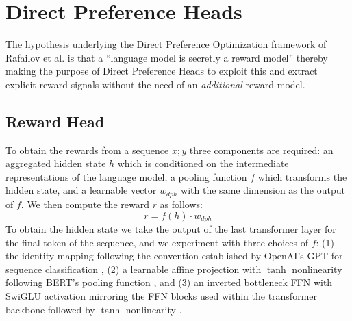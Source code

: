 \section{Direct Preference Heads}
The hypothesis underlying the Direct Preference Optimization framework of Rafailov et al. \cite{rafailov2023direct} is that a ``language model is secretly a reward model'' thereby making the purpose of Direct Preference Heads to exploit this and extract explicit reward signals without the need of an \emph{additional} reward model.



\subsection{Reward Head}
To obtain the rewards from a sequence $x;y$ three components are required: an aggregated hidden state $h$ which is conditioned on the intermediate representations of the language model, a pooling function $f$ which transforms the hidden state, and a learnable vector $w_{dph}$ with the same dimension as the output of $f$. We then compute the reward $r$ as follows:
\begin{equation}
    r=f(h) \cdot w_{dph}
\end{equation}
To obtain the hidden state we take the output of the last transformer layer for the final token of the sequence, and we experiment with three choices of $f$: (1) the identity mapping following the convention established by OpenAI's GPT for sequence classification \cite{Radford2018ImprovingLU}, (2) a learnable affine projection with $\tanh$ nonlinearity following BERT's pooling function \cite{devlin2019bert}, and (3) an inverted bottleneck FFN with SwiGLU activation mirroring the FFN blocks used within the transformer backbone followed by $\tanh$ nonlinearity \cite{shazeer2020glu}.

